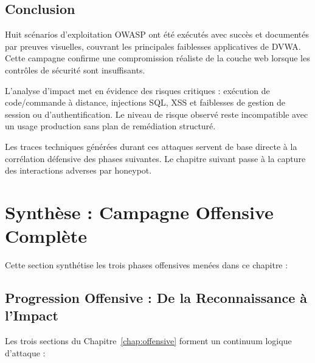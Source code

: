 \documentclass[12pt,a4paper,openany]{report}
\begin{document}
	
	
	
	\subsection{Conclusion}
	
	Huit scénarios d'exploitation OWASP ont été exécutés avec succès et documentés par preuves visuelles, couvrant les principales faiblesses applicatives de DVWA. Cette campagne confirme une compromission réaliste de la couche web lorsque les contrôles de sécurité sont insuffisants.
	
	L'analyse d'impact met en évidence des risques critiques : exécution de code/commande à distance, injections SQL, XSS et faiblesses de gestion de session ou d'authentification. Le niveau de risque observé reste incompatible avec un usage production sans plan de remédiation structuré.
	
	Les traces techniques générées durant ces attaques servent de base directe à la corrélation défensive des phases suivantes. Le chapitre suivant passe à la capture des interactions adverses par honeypot.
	
	\section{Synthèse : Campagne Offensive Complète}
	
	Cette section synthétise les trois phases offensives menées dans ce chapitre :
	
	\subsection{Progression Offensive : De la Reconnaissance à l'Impact}
	
	Les trois sections du Chapitre~\ref{chap:offensive} forment un continuum logique d'attaque :
	
\end{document}
